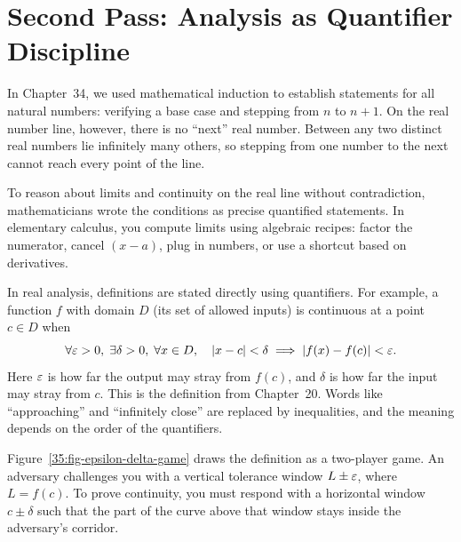 \section{Second Pass: Analysis as Quantifier Discipline}
\chapterline

In Chapter~34, we used mathematical induction to establish statements for all natural numbers: verifying a base case and stepping from $n$ to $n+1$. On the real number line, however, there is no ``next'' real number. Between any two distinct real numbers lie infinitely many others, so stepping from one number to the next cannot reach every point of the line.

To reason about limits and continuity on the real line without contradiction, mathematicians wrote the conditions as precise quantified statements. In elementary calculus, you compute limits using algebraic recipes: factor the numerator, cancel $(x-a)$, plug in numbers, or use a shortcut based on derivatives.

In real analysis, definitions are stated directly using quantifiers. For example, a function $f$ with domain $D$ (its set of allowed inputs) is continuous at a point $c \in D$ when
\[
\forall \varepsilon > 0, \; \exists \delta > 0, \; \forall x \in D, \quad |x - c| < \delta \implies |f(x) - f(c)| < \varepsilon.
\]
Here $\varepsilon$ is how far the output may stray from $f(c)$, and $\delta$ is how far the input may stray from $c$. This is the definition from Chapter~20. Words like ``approaching'' and ``infinitely close'' are replaced by inequalities, and the meaning depends on the order of the quantifiers.

Figure~\ref{35:fig-epsilon-delta-game} draws the definition as a two-player game. An adversary challenges you with a vertical tolerance window $L \pm \varepsilon$, where $L = f(c)$. To prove continuity, you must respond with a horizontal window $c \pm \delta$ such that the part of the curve above that window stays inside the adversary's corridor.

